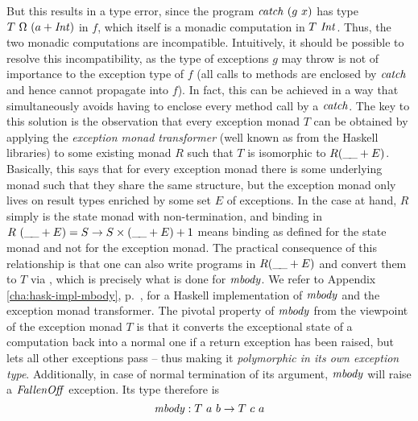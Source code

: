 \begin{expl}
But this results in a type error, since the program $\mathit{catch}\ (g\ x)$ has type
$T\ \Omega\ (a + \mathit{Int})$ in $f$, which itself is a monadic computation in $T\
\mathit{Int}$. Thus, the two monadic computations are incompatible. Intuitively, it
should be possible to resolve this incompatibility, as the type of exceptions
$g$ may throw is not of importance to the exception type of $f$ (all calls to
methods are enclosed by $\mathit{catch}$ and hence cannot propagate into $f$). In
fact, this can be achieved in a way that simultaneously avoids having to enclose
every method call by a $\mathit{catch}$. The key to this solution is the observation
that every exception monad $T$ can be obtained by applying the \emph{exception
  monad transformer} (well known as \code{ErrorT} from the Haskell libraries) to
some existing monad $R$ such that $T$ is isomorphic to $R(\_\!\_ + E)$. Basically,
this says that for every exception monad there is some underlying monad such
that they share the same structure, but the exception monad only lives on result
types enriched by some set $E$ of exceptions. In the case at hand, $R$ simply is
the state monad with non-termination, and binding in $R\ (\_\!\_+E) = S \to S \times
(\_\!\_+E) + 1$ means binding as defined for the state monad and not for the
exception monad.  The practical consequence of this relationship is that one can
also write programs in $R(\_\!\_+E)$ and convert them to $T$ via \code{ErrorT},
which is precisely what is done for $\mathit{mbody}$. We refer to Appendix
\ref{cha:hask-impl-mbody}, p.~\pageref{page:mbody-def}, for a Haskell
implementation of $\mathit{mbody}$ and the exception monad transformer. The pivotal
property of $\mathit{mbody}$ from the viewpoint of the exception monad $T$ is that it
converts the exceptional state of a computation back into a normal one if a
return exception has been raised, but lets all other exceptions pass -- thus
making it \emph{polymorphic in its own exception type}. Additionally, in case of
normal termination of its argument, $\mathit{mbody}$ will raise a $\mathit{FallenOff}$
exception.  Its type therefore is
\[
  \mbody : T\ a\ b \to T\ c\ a
\]


\end{expl}
